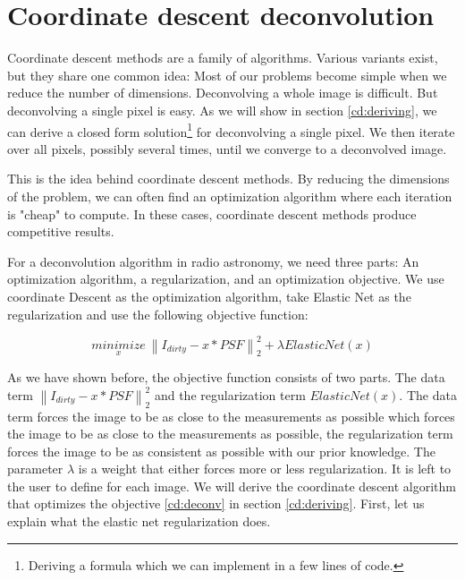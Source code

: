 \section{Coordinate descent deconvolution}\label{cd}
Coordinate descent methods are a family of algorithms. Various variants exist\cite{richtarik2014iteration, richtarik2016distributed, richtarik2016parallel}, but they share one common idea: Most of our problems become simple when we reduce the number of dimensions. Deconvolving a whole image is difficult. But deconvolving a single pixel is easy. As we will show in section \ref{cd:deriving}, we can derive a closed form solution\footnote{Deriving a formula which we can implement in a few lines of code.} for deconvolving a single pixel. We then iterate over all pixels, possibly several times, until we converge to a deconvolved image. 

This is the idea behind coordinate descent methods. By reducing the dimensions of the problem, we can often find an optimization algorithm where each iteration is "cheap" to compute. In these cases, coordinate descent methods produce competitive results\cite{nesterov2012efficiency, nesterov2013gradient}.

For a deconvolution algorithm in radio astronomy, we need three parts: An optimization algorithm, a regularization, and an optimization objective. We use coordinate Descent as the optimization algorithm, take Elastic Net as the regularization and use the following objective function:

\begin{equation}\label{cd:deconv}
\underset{x}{minimize} \: \left \| I_{dirty} - x * PSF \right \|_2^2 + \lambda ElasticNet(x)
\end{equation}

As we have shown before, the objective function consists of two parts. The data term $\left \| I_{dirty} - x * PSF \right \|_2^2$ and the regularization term $ElasticNet(x)$. The data term forces the image to be as close to the measurements as possible which forces the image to be as close to the measurements as possible, the regularization term forces the image to be as consistent as possible with our prior knowledge. The parameter $\lambda$ is a weight that either forces more or less regularization. It is left to the user to define for each image. We will derive the coordinate descent algorithm that optimizes the objective \eqref{cd:deconv} in section \ref{cd:deriving}. First, let us explain what the elastic net regularization does.


